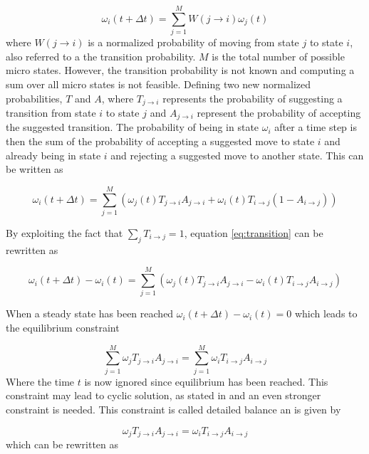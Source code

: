 \documentclass{article}
\begin{document}
\begin{equation}
\omega_i(t+\Delta t) = \sum\limits_{j=1}^M W(j\rightarrow i) \omega_j(t) 
\end{equation}
where $W(j\rightarrow i)$ is a normalized probability of moving from state $j$ to state $i$, also referred to a the transition probability. $M$ is the total number of possible micro states. However, the transition probability is not known and computing a sum over all micro states is not feasible. Defining two new normalized probabilities, $T$ and $A$, where $T_{j\rightarrow i}$ represents the probability of suggesting a transition from state $i$ to state $j$ and $A_{j\rightarrow i}$ represent the probability of accepting the suggested transition. The probability of being in state $\omega_i$ after a time step is then the sum of the probability of accepting a suggested move to state $i$ and already being in state $i$ and rejecting a suggested move to another state. This can be written as

\begin{equation}
\omega_i(t+\Delta t) = \sum\limits_{j=1}^M (\omega_j(t)T_{j\rightarrow i}A_{j\rightarrow i} + \omega_i(t)T_{i\rightarrow j}(1 - A_{i\rightarrow j}))
\label{eq:transition}
\end{equation}

By exploiting the fact that $\sum\limits_j T_{i\rightarrow j} = 1$, equation \ref{eq:transition} can be rewritten as

\begin{equation}
\omega_i(t+\Delta t) - \omega_i(t) = \sum\limits_{j=1}^M (\omega_j(t)T_{j\rightarrow i}A_{j\rightarrow i} - \omega_i(t)T_{i\rightarrow j}A_{i\rightarrow j})
\end{equation}

When a steady state has been reached $\omega_i(t+\Delta t) - \omega_i(t) = 0$ which leads to the equilibrium constraint 

\begin{equation}
\sum\limits_{j=1}^M \omega_jT_{j\rightarrow i}A_{j\rightarrow i} = \sum\limits_{j=1}^M \omega_iT_{i\rightarrow j}A_{i\rightarrow j}
\end{equation}
Where the time $t$ is now ignored since equilibrium has been reached. This constraint may lead to cyclic solution, as stated in \cite{lectures} and an even stronger constraint is needed. This constraint is called detailed balance an is given by 

\begin{equation}
\omega_jT_{j\rightarrow i}A_{j\rightarrow i} = \omega_iT_{i\rightarrow j}A_{i\rightarrow j}
\end{equation}
which can be rewritten as 
\end{document}
